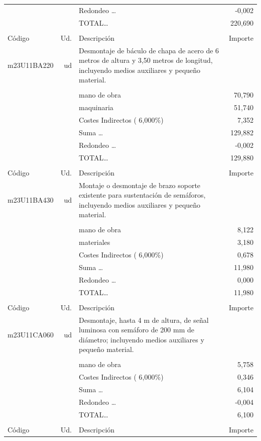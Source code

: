 \documentclass{book}%
\begin{document}
\begin{supertabular}{l r p{60mm} r}
&&Redondeo \ldots&    {-}0,002\\%
%
&&TOTAL\ldots&   220,690\\%
&&&\\%
Código&Ud.&Descripción&Importe\\%
\hline%
m23U11BA220&ud&Desmontaje de báculo de chapa de acero de 6 metros de altura y 3,50 metros de longitud, incluyendo medios auxiliares y pequeño material.&\\%
&&&\\%
&&mano de obra&    70,790\\%
&&maquinaria&    51,740\\%
&&Costes Indirectos (     6,000\%)&     7,352\\%
&&Suma \ldots&   129,882\\%
&&Redondeo \ldots&    {-}0,002\\%
%
&&TOTAL\ldots&   129,880\\%
&&&\\%
Código&Ud.&Descripción&Importe\\%
\hline%
m23U11BA430&ud&Montaje o desmontaje de brazo soporte existente para sustentación de semáforos, incluyendo medios auxiliares y pequeño material.&\\%
&&&\\%
&&mano de obra&     8,122\\%
&&materiales&     3,180\\%
&&Costes Indirectos (     6,000\%)&     0,678\\%
&&Suma \ldots&    11,980\\%
&&Redondeo \ldots&     0,000\\%
%
&&TOTAL\ldots&    11,980\\%
&&&\\%
Código&Ud.&Descripción&Importe\\%
\hline%
m23U11CA060&ud&Desmontaje, hasta 4 m de altura, de señal luminosa con semáforo de 200 mm de diámetro; incluyendo medios auxiliares y pequeño material.&\\%
&&&\\%
&&mano de obra&     5,758\\%
&&Costes Indirectos (     6,000\%)&     0,346\\%
&&Suma \ldots&     6,104\\%
&&Redondeo \ldots&    {-}0,004\\%
%
&&TOTAL\ldots&     6,100\\%
&&&\\%
Código&Ud.&Descripción&Importe\\%

\end{supertabular}
\end{document}
